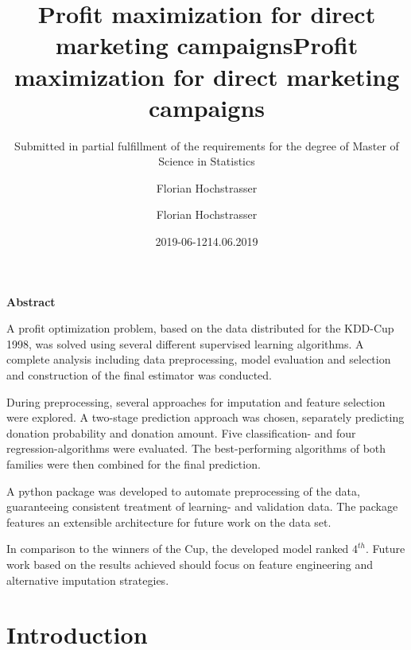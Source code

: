 \documentclass[
  11pt,
  a4paper,
  DIV=12,captions=tableheading,oneside,titlepage]{scrbook}
\title{Profit maximization for direct marketing campaigns}
\author{Florian Hochstrasser}
\date{2019-06-12}
\makeatletter
\newcommand\abstractname{Abstract}  %
\newenvironment{abstract}{%
      \titlepage
      \null\vfil
      \@beginparpenalty\@lowpenalty
      \begin{center}%
        \bfseries \abstractname
        \@endparpenalty\@M
      \end{center}}%
     {\par\vfil\null\endtitlepage}
\newenvironment{abstract}{%
      \if@twocolumn
        \addchap*{\abstractname}%
      \else
        \small
        \begin{center}%
          \addchap*{\abstractname}%
        \end{center}%
        \quotation
      \fi}
      {\if@twocolumn\else\endquotation\fi}
\let\oldmaketitle\maketitle
\makeatother
\begin{document}
\maketitle

\begin{titlepage}

\titlehead{Master Thesis}
\title{Profit maximization for direct marketing campaigns}
\subject{An application of data-driven decision making}
\subtitle{Submitted in partial fulfillment of the requirements for the degree of Master of Science in Statistics}
\author{Florian Hochstrasser}
\date{14.06.2019}
\publishers{Supervisor: Jacques Zuber}

\end{titlepage}

\let\maketitle\oldmaketitle
\maketitle

\begin{abstract}
A profit optimization problem, based on the data distributed for the KDD-Cup 1998, was solved using several different supervised learning algorithms. A complete analysis including data preprocessing, model evaluation and selection and construction of the final estimator was conducted.

During preprocessing, several approaches for imputation and feature selection were explored. A two-stage prediction approach was chosen, separately predicting donation probability and donation amount. Five classification- and four regression-algorithms were evaluated. The best-performing algorithms of both families were then combined for the final prediction.

A python package was developed to automate preprocessing of the data, guaranteeing consistent treatment of learning- and validation data. The package features an extensible architecture for future work on the data set.

In comparison to the winners of the Cup, the developed model ranked $4^{th}$. Future work based on the results achieved should focus on feature engineering and alternative imputation strategies.
\end{abstract}

{
\setcounter{tocdepth}{2}
\tableofcontents
}
\listoffigures
\hypertarget{intro}{%
\chapter{Introduction}\label{intro}}
\end{document}
